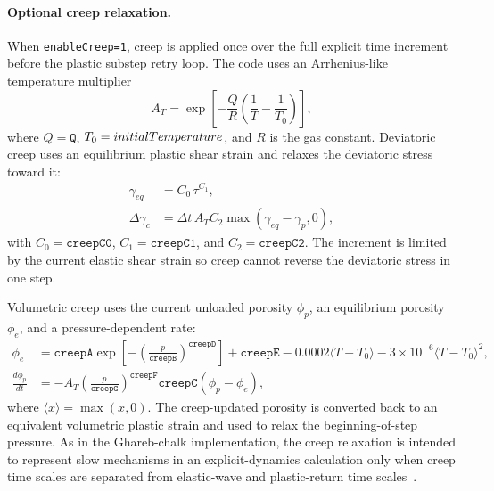 \paragraph{Optional creep relaxation.}
When \texttt{enableCreep=1}, creep is applied once over the full explicit time increment before the plastic substep retry loop.  The code uses an Arrhenius-like temperature multiplier
\begin{equation}
  A_T = \exp\left[-\frac{Q}{R}\left(\frac{1}{T}-\frac{1}{T_0}\right)\right],
  \label{eq:geomechanics-temperature-creep}
\end{equation}
where \(Q=\texttt{Q}\), \(T_0=initialTemperature\), and \(R\) is the gas constant.  Deviatoric creep uses an equilibrium plastic shear strain and relaxes the deviatoric stress toward it:
\begin{align}
  \gamma_{eq} &= C_0\,\tau^{C_1},\\
  \Delta\gamma_c &= \Delta t\,A_T C_2\max(\gamma_{eq}-\gamma_p,0),
  \label{eq:geomechanics-dev-creep}
\end{align}
with \(C_0=\texttt{creepC0}\), \(C_1=\texttt{creepC1}\), and \(C_2=\texttt{creepC2}\).  The increment is limited by the current elastic shear strain so creep cannot reverse the deviatoric stress in one step.

Volumetric creep uses the current unloaded porosity \(\phi_p\), an equilibrium porosity \(\phi_e\), and a pressure-dependent rate:
\begin{align}
  \phi_e &= \texttt{creepA}\exp\left[-\left(\frac{p}{\texttt{creepB}}\right)^{\texttt{creepD}}\right]
           + \texttt{creepE} - 0.0002\langle T-T_0\rangle - 3\times 10^{-6}\langle T-T_0\rangle^2,\\
  \frac{d\phi_p}{dt} &= -A_T\left(\frac{p}{\texttt{creepG}}\right)^{\texttt{creepF}}
  \texttt{creepC}\left(\phi_p-\phi_e\right),
  \label{eq:geomechanics-vol-creep}
\end{align}
where \(\langle x\rangle=\max(x,0)\).  The creep-updated porosity is converted back to an equivalent volumetric plastic strain and used to relax the beginning-of-step pressure.  As in the Ghareb-chalk implementation, the creep relaxation is intended to represent slow mechanisms in an explicit-dynamics calculation only when creep time scales are separated from elastic-wave and plastic-return time scales~\cite{malenda2025ghareb}.

